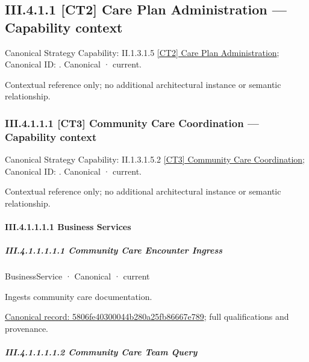 \subsection*{III.4.1.1 [CT2] Care Plan Administration — Capability context}
\label{navigation:III.4.1.1}

{\small Canonical Strategy Capability: II.1.3.1.5 \hyperref[element:cf06eec5699f406fa30a00d2f76e3098]{[CT2] Care Plan Administration}; Canonical ID: \texttt{}. Canonical · current.}\par
Contextual reference only; no additional architectural instance or semantic relationship.\par
\subsubsection*{III.4.1.1.1 [CT3] Community Care Coordination — Capability context}
\label{navigation:III.4.1.1.1}

{\small Canonical Strategy Capability: II.1.3.1.5.2 \hyperref[element:8c8c6266d9ed43e09dbe44fcdd669132]{[CT3] Community Care Coordination}; Canonical ID: \texttt{}. Canonical · current.}\par
Contextual reference only; no additional architectural instance or semantic relationship.\par
\paragraph*{III.4.1.1.1.1 Business Services}
\label{navigation:III.4.1.1.1.1}

\subparagraph*{III.4.1.1.1.1.1 Community Care Encounter Ingress}
\label{navigation:III.4.1.1.1.1.1}

\label{element:5806fe40300044b280a25fb86667e789}
{\small BusinessService · Canonical · current}\par

Ingests community care documentation.


{\footnotesize \href{../../../../../../../continuum/business/business-service/5806fe40300044b280a25fb86667e789.md}{Canonical record: 5806fe40300044b280a25fb86667e789}; full qualifications and provenance.}\par
\subparagraph*{III.4.1.1.1.1.2 Community Care Team Query}
\label{navigation:III.4.1.1.1.1.2}

